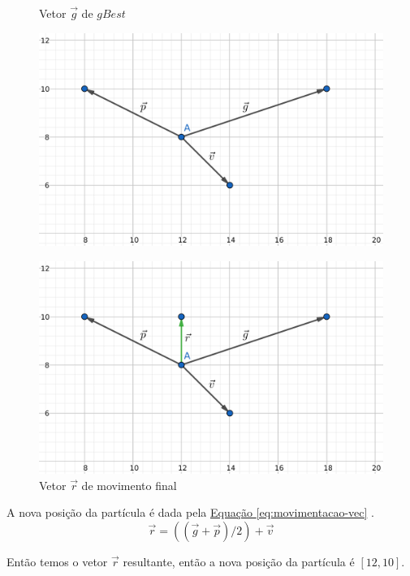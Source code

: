 \begin{figure}[!htb]
\begin{minipage}{\textwidth}
\begin{minipage}{0.48\textwidth}
\centering
\caption{Vetor $\vec g$ de $gBest$}
\label{fig:vetor-g}
\includegraphics[width=.9\linewidth]{assets/vec3.png}
\end{minipage}
\begin{minipage}{0.48\textwidth}
\centering
\caption{Vetor $\vec r$ de movimento final}
\label{fig:vetor-r}
\includegraphics[width=.9\linewidth]{assets/vec4.png}
\end{minipage}

\end{minipage}
\end{figure}

\noindent A nova posição da partícula é dada pela 
\hyperref[eq:movimentacao-vec]{Equação \ref{eq:movimentacao-vec}}
.
%
\begin{equation} 
    \label{eq:movimentacao-vec}
    \vec r = ((\vec g + \vec p) / 2) + \vec v
\end{equation}

\noindent Então temos o vetor $\vec r$ resultante, então a nova posição da partícula é $[12,10]$.

